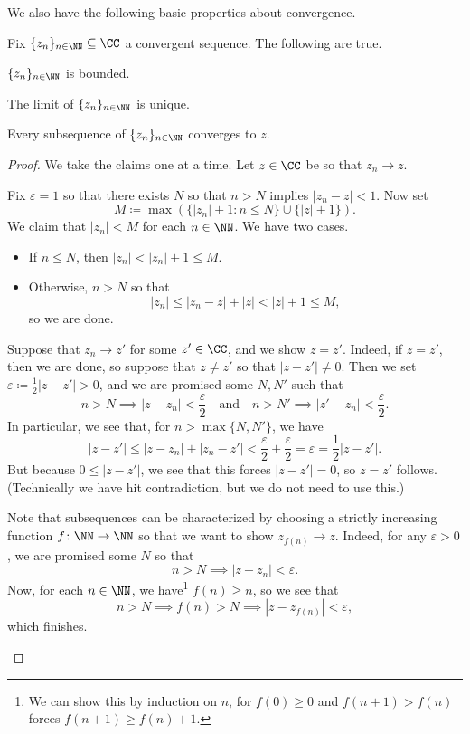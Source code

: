 We also have the following basic properties about convergence.
\begin{proposition}
	Fix $\{z_n\}_{n\in\NN}\subseteq\CC$ a convergent sequence. The following are true.
	\begin{listalph}
		\item $\{z_n\}_{n\in\NN}$ is bounded.
		\item The limit of $\{z_n\}_{n\in\NN}$ is unique.
		\item Every subsequence of $\{z_n\}_{n\in\NN}$ converges to $z$.
	\end{listalph}
\end{proposition}
\begin{proof}
	We take the claims one at a time. Let $z\in\CC$ be so that $z_n\to z$.
	\begin{listalph}
		\item Fix $\varepsilon=1$ so that there exists $N$ so that $n>N$ implies $|z_n-z|<1$. Now set
		\[M\coloneqq \max(\{|z_n|+1:n\le N\}\cup\{|z|+1\}).\]
		We claim that $|z_n|<M$ for each $n\in\NN$. We have two cases.
		\begin{itemize}
			\item If $n\le N$, then $|z_n|<|z_n|+1\le M$.
			\item Otherwise, $n>N$ so that
			\[|z_n|\le|z_n-z|+|z|<|z|+1\le M,\]
			so we are done.
		\end{itemize}

		\item Suppose that $z_n\to z'$ for some $z'\in\CC$, and we show $z=z'$. Indeed, if $z=z'$, then we are done, so suppose that $z\ne z'$ so that $|z-z'|\ne0$. Then we set $\varepsilon\coloneqq \frac12|z-z'|>0$, and we are promised some $N,N'$ such that
		\[n>N\implies|z-z_n|<\frac\varepsilon2\quad\text{and}\quad n>N'\implies|z'-z_n|<\frac\varepsilon2.\]
		In particular, we see that, for $n>\max\{N,N'\}$, we have
		\[|z-z'|\le|z-z_n|+|z_n-z'|<\frac\varepsilon2+\frac\varepsilon2=\varepsilon=\frac12|z-z'|.\]
		But because $0\le|z-z'|$, we see that this forces $|z-z'|=0$, so $z=z'$ follows. (Technically we have hit contradiction, but we do not need to use this.)

		\item Note that subsequences can be characterized by choosing a strictly increasing function $f\colon\NN\to\NN$ so that we want to show $z_{f(n)}\to z$. Indeed, for any $\varepsilon>0$, we are promised some $N$ so that
		\[n>N\implies|z-z_n|<\varepsilon.\]
		Now, for each $n\in\NN$, we have\footnote{We can show this by induction on $n$, for $f(0)\ge0$ and $f(n+1)>f(n)$ forces $f(n+1)\ge f(n)+1$.} $f(n)\ge n$, so we see that
		\[n>N\implies f(n)>N\implies|z-z_{f(n)}|<\varepsilon,\]
		which finishes.
		\qedhere
	\end{listalph}
\end{proof}

